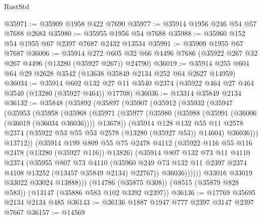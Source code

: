 \begin{lexlean}{RustStd}
\begin{coremodule}
@35971 := @35909 @1958 @422 @7690
@35977 := @35914 @1956 @246 @54 @57 @7688 @2683
@35980 := @35955 @1956 @54 @7688
@35988 := @35960 @152 @54 @1955 @67 @2397 @7687 @2432 @13534
@35991 := @35909 @1955 @67 @7687
@36006 := @35914
    @272
    @605
    @32
    @66
    @4496
    @7686
    (@35922 @267 @32 @267 @4496 (@13280 (@35927 @267)) @24790)
@36019 := @35914 @255 @604 @64 @29 @2628 @3542 (@13638 @35849 @2134 @252 @64 @2627 @14959)
@36034 := @35914
    @602
    @132
    @27
    @11
    @3540
    @2374
    (@35922 @464 @27 @464 @3540 (@13280 (@35927 @464)) @17708)
@36036 := @13314 @35849 @2134
@36132 := @35848
    (@35892
      (@35897
        (@35907
          (@35912
            (@35932
              (@35947
                (@35953
                  (@35958
                    (@35968
                      (@35971
                        (@35977
                          (@35980 (@35988 (@35991 (@36006 (@36019 (@36034 @36036)))) @13678))
                          (@35914
                            @128
                            @132
                            @55
                            @11
                            @2578
                            @2374
                            (@35922 @53 @55 @53 @2578 (@13280 (@35927 @53)) @14604)
                            @36036)))
                      @13712))
                  (@35914
                    @199
                    @809
                    @55
                    @75
                    @2478
                    @4112
                    (@35922 @116 @55 @116 @2478 (@13280 (@35927 @116)) @13826)
                    (@35914
                      @807
                      @132
                      @73
                      @11
                      @4110
                      @2374
                      (@35955
                        @807
                        @73
                        @4110
                        (@35960
                          @249
                          @73
                          @132
                          @11
                          @2397
                          @2374
                          @4108
                          @13252
                          (@13457 @35849 @2134)
                          @22767))
                      @36036))))))
          @33016
          @33019
          @33022
          @33024
          @13888)))
    (@14786 (@35875 @308))
    (@8515 (@35879 @828 @583))
    (@13147 (@35886 @583 @102 @3392 @2397))
@36136 := @17769 @35695 @2134 @2134 @485
@36143 := @36136 @1887 @1947 @777 @2397 @3147 @2397 @7667
@36157 := @14569

\end{coremodule}
\end{lexlean}
